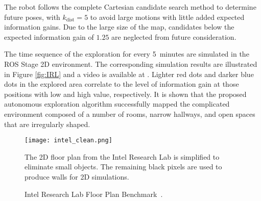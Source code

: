 The robot follows the complete Cartesian candidate search method to determine future poses, with $k_\text{dist}=5$ to avoid large motions with little added expected information gains. Due to the large size of the map, candidates below the expected information gain of $1.25$ are neglected from future consideration.

The time sequence of the exploration for every 5~minutes are simulated in the ROS Stage 2D environment. The corresponding simulation results are illustrated in Figure \ref{fig:IRL} and a video is available at \href{https://www.youtube.com/watch?v=5VdzKHreB_s}{}.
Lighter red dots and darker blue dots in the explored area correlate to the level of information gain at those positions with low and high value, respectively. It is shown that the proposed autonomous exploration algorithm successfully mapped the complicated environment composed of a number of rooms, narrow hallways, and open spaces that are irregularly shaped.


\begin{figure}
	\centering
	\texttt{[image: intel\_clean.png]}
	\caption{Intel Research Lab Floor Plan Benchmark~\cite{kummerle2009measuring}.}
	\medskip
	\small
	The 2D floor plan from the Intel Research Lab is simplified to eliminate small objects. The remaining black pixels are used to produce walls for 2D simulations.
\label{fig:intel}
\end{figure}



